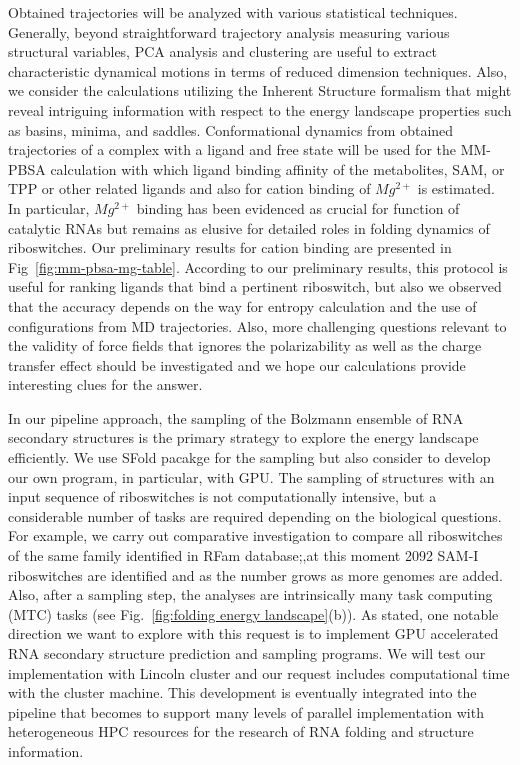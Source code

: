 \documentclass[a4paper,10pt]{article}
\begin{document}
Obtained trajectories will be analyzed with various statistical techniques.  Generally, beyond straightforward trajectory analysis measuring various structural variables, PCA analysis and clustering are useful to extract characteristic dynamical motions in terms of reduced dimension techniques\cite{kimjpcb2010, SAM-I-NAR2009}.   Also, we consider the calculations utilizing the Inherent Structure formalism that might reveal intriguing information with respect to the energy landscape properties such as basins, minima, and saddles\cite{kimpre2002,kimjcp2004}.  Conformational dynamics from obtained trajectories of a complex with a ligand and free state will be used for the MM-PBSA calculation with which ligand binding affinity of the metabolites, SAM, or TPP or other related ligands and also for cation binding of ${Mg^{2+}}$ is estimated.  In particular, ${Mg^{2+}}$ binding has been evidenced as crucial for function of catalytic RNAs but remains as elusive for detailed roles in folding dynamics of riboswitches.  Our preliminary results for cation binding are presented in Fig~\ref{fig:mm-pbsa-mg-table}.  According to our preliminary results, this protocol is useful for ranking ligands that bind a pertinent riboswitch, but also we observed that the accuracy depends on the way for entropy calculation and the use of configurations from MD trajectories.  Also, more challenging questions relevant to the validity of force fields that ignores the polarizability as well as the charge transfer effect should be investigated and we hope our calculations provide interesting clues for the answer.      

In our pipeline approach, the sampling of the Bolzmann ensemble of RNA secondary structures is the primary strategy to explore the energy landscape efficiently.  We use SFold pacakge\cite{ding2006} for the sampling but also consider to develop our own program, in particular, with GPU. The sampling of structures with an input sequence of riboswitches is not computationally intensive, but a considerable number of tasks are required depending on the biological questions.  For example, we carry out comparative investigation to compare all riboswitches of the same family identified in RFam database;,at this moment 2092 SAM-I riboswitches are identified and as the number grows as more genomes are added.  Also, after a sampling step, the analyses are intrinsically many task computing (MTC) tasks (see Fig.~\ref{fig:folding energy landscape}(b)).  
As stated, one notable direction we want to explore with this request is to implement GPU accelerated RNA secondary structure prediction and sampling programs.  We will test our implementation with Lincoln cluster and our request includes computational time with the cluster machine. This development is eventually integrated into the pipeline that becomes to support many levels of parallel implementation with heterogeneous HPC resources for the research of RNA folding and structure information.
\end{document}
